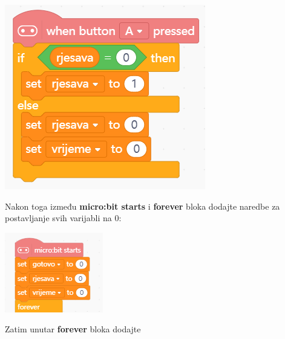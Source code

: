 \includegraphics[scale=0.75]{Rjesenje6.png}

\vspace{3mm}

Nakon toga između \textbf{micro:bit starts} i \textbf{forever} bloka dodajte naredbe za postavljanje svih varijabli na 0:

\vspace{3mm}

\includegraphics[scale=0.75]{Rjesenje7.png}

\vspace{3mm}

Zatim unutar \textbf{forever} bloka dodajte

\vspace{3mm}

